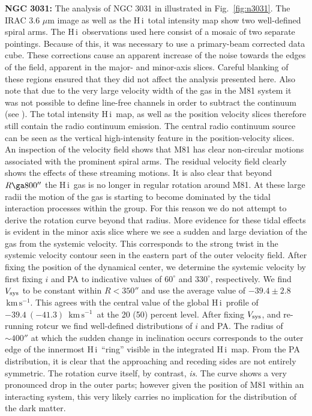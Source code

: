 \documentclass[usenatbib,usegraphicx,apjfonts,floatfix]{emulateapj}
\newcommand{\kms}{\ensuremath{\,\mbox{km}\,\mbox{s}^{-1}}}
\newcommand{\HI}{H\,{\sc i}}
\begin{document}
{\bf NGC 3031:} The analysis of NGC 3031 in illustrated in Fig.~\ref{fig:n3031}.
The IRAC 3.6 $\mu$m image
as well as the \HI\ total intensity map show two well-defined spiral
arms. The \HI\ observations used here consist of a mosaic of two
separate pointings. Because of this, it was necessary to use a
primary-beam corrected data cube.  These corrections cause an apparent
increase of the noise towards the edges of the field, apparent in the
major- and minor-axis slices. Careful blanking of these regions
ensured that they did not affect the analysis presented here.  Also
note that due to the very large velocity width of the gas in the M81
system it was not possible to define line-free channels in order to
subtract the continuum (see \citealt{THINGS1}).  The total
intensity \HI\ map, as well as the position velocity slices therefore
still contain the radio continuum emission. The central radio
continuum source can be seen as the vertical high-intensity feature in the
position-velocity slices.
An inspection of the velocity field shows that M81 has clear
non-circular motions associated with the prominent spiral arms.  The
residual velocity field clearly shows the effects of these streaming
motions.  It is also clear that beyond $R \ga 800''$ the \HI\ gas is
no longer in regular rotation around M81. At these large radii the
motion of the gas is starting to become dominated by the tidal
interaction processes within the group. For this reason we do not
attempt to derive the rotation curve beyond that radius. More evidence
for these tidal effects is evident in the minor axis slice where we
see a sudden and large deviation of the gas from the systemic
velocity. This corresponds to the strong twist in the systemic
velocity contour seen in the eastern part of the outer velocity field.
After fixing the position of the dynamical center, we determine the
systemic velocity by first fixing $i$ and PA to indicative values of
$60^{\circ}$ and ${330^{\circ}}$, respectively. We find $V_{\rm sys}$
to be constant within $R<350''$ and use the average value of $-39.4
\pm 2.8$ \kms. This agrees with the central value of the global
\HI\ profile of $-39.4\ (-41.3)$ \kms\ at the 20 (50) percent level.
After fixing $V_{\rm sys}$, and re-running {\sc rotcur} we find
well-defined distributions of $i$ and PA. The radius of $\sim 400''$
at which the sudden change in inclination occurs corresponds to the
outer edge of the innermost \HI\ ``ring'' visible in the integrated
\HI\ map. From the PA distribution, it is clear that the approaching
and receding sides are not entirely symmetric. The rotation curve
itself, by contrast, \emph{is}.  The curve shows a very pronounced
drop in the outer parts; however given the position of M81 within an
interacting system, this very likely carries no implication for the
distribution of the dark matter.
\end{document}
